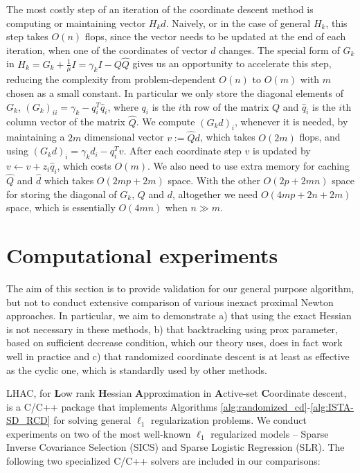 \documentclass[11pt]{article}
\numberwithin{equation}{section}
\begin{document}
The most costly step of an iteration of the coordinate descent method is computing or maintaining vector  $H_kd$. Naively, or in the case of general $H_k$, this step takes $O(n)$ flops, since the vector needs to be updated at the end of each iteration, when one of the coordinates of vector $d$ changes.  The special form of  $G_k$ in $H_k=G_k+\frac{1}{\mu} I=\gamma_kI-Q\hat Q$ gives us an opportunity to accelerate this step, reducing the complexity from problem-dependent $O(n)$ to $O(m)$ with $m$ chosen as a small constant. In particular we only store the diagonal elements of $G_k$, $(G_k)_{ii} = \gamma_k - q_i^T\hat q_i$, where $q_i$ is the $i$th row of the matrix $Q$ and $\hat q_i$ is the $i$th column vector of the matrix $\hat Q$. We compute $(G_kd)_i$,  whenever it is needed, by 
 maintaining a $2m$ dimensional vector $v := \hat Qd$, 
which takes $O(2m)$ flops, and using  $(G_kd)_i = \gamma_k d_i - q_i^T v$.
After each coordinate step $v$ is updated by $v \gets v + z_i \hat q_i$, which costs $O(m)$. We also need to use extra memory for caching $\hat Q$ and $\hat d$ which takes $O(2mp + 2m)$ space. With the other $O(2p + 2mn)$ space for storing the diagonal of $G_k$, $Q$ and $d$, altogether we need $O(4mp + 2n + 2m)$ space, which is essentially $O(4mn)$ when $n \gg m$.


\section{Computational experiments} %
\label{sec:comp}

The aim of this section is to provide validation for our general purpose algorithm, but not to conduct extensive comparison of various inexact proximal Newton approaches. 
In particular, we aim to demonstrate a) that using the exact Hessian is not necessary in these methods, b) that backtracking using prox parameter, based on sufficient decrease condition, which our theory uses, does in fact work well in practice and c) that randomized coordinate descent is at least as effective as the cyclic one, which is standardly used by other methods.

LHAC, for \textbf{L}ow rank \textbf{H}essian \textbf{A}pproximation in \textbf{A}ctive-set \textbf{C}oordinate descent, is a C/C++ package that implements Algorithms \ref{alg:randomized_cd}-\ref{alg:ISTA-SD_RCD} for solving general $\ell_1$ regularization problems. We conduct experiments on two of the most well-known $\ell_1$ regularized models -- Sparse Inverse Covariance Selection (SICS) and Sparse Logistic Regression (SLR). The following two specialized C/C++ solvers are included in our comparisons:
\end{document}
